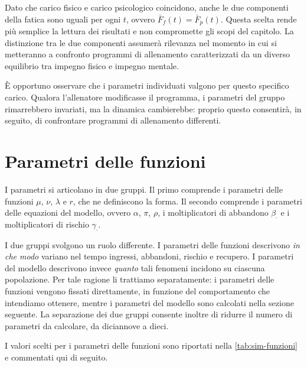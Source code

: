 Dato che carico fisico e carico psicologico coincidono, anche le due componenti della fatica sono uguali per ogni $t$, ovvero $\bar{F}_f(t) = \bar{F}_p(t)$. Questa scelta rende più semplice la lettura dei risultati e non compromette gli scopi del capitolo. La distinzione tra le due componenti assumerà rilevanza nel momento in cui si metteranno a confronto programmi di allenamento caratterizzati da un diverso equilibrio tra impegno fisico e impegno mentale. \par

È opportuno osservare che i parametri individuati valgono per questo specifico carico. Qualora l'allenatore modificasse il programma, i parametri del gruppo rimarrebbero invariati, ma la dinamica cambierebbe: proprio questo consentirà, in seguito, di confrontare programmi di allenamento differenti.

\section{Parametri delle funzioni}

I parametri si articolano in due gruppi. Il primo comprende i parametri delle funzioni $\mu$, $\nu$, $\lambda$ e $r$, che ne definiscono la forma. Il secondo comprende i parametri delle equazioni del modello, ovvero $\alpha$, $\pi$, $\rho$, i moltiplicatori di abbandono $\beta_\cdot$ e i moltiplicatori di rischio $\gamma_\cdot$. \par

I due gruppi svolgono un ruolo differente. I parametri delle funzioni descrivono \emph{in che modo} variano nel tempo ingressi, abbandoni, rischio e recupero. I parametri del modello descrivono invece \emph{quanto} tali fenomeni incidono su ciascuna popolazione. Per tale ragione li trattiamo separatamente: i parametri delle funzioni vengono fissati direttamente, in funzione del comportamento che intendiamo ottenere, mentre i parametri del modello sono calcolati nella sezione seguente. La separazione dei due gruppi consente inoltre di ridurre il numero di parametri da calcolare, da diciannove a dieci. \par

I valori scelti per i parametri delle funzioni sono riportati nella \autoref{tab:sim-funzioni} e commentati qui di seguito.

